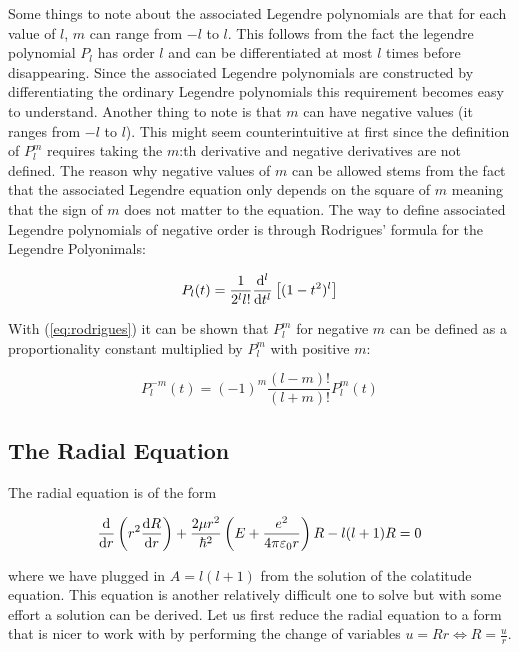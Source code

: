 \documentclass{article}
\begin{document}
    Some things to note about the associated Legendre polynomials are that for each value of $l$, $m$ can range from $-l$ to $l$. This follows from the fact the legendre polynomial $P_{l}$ has
    order $l$ and can be differentiated at most $l$ times before disappearing. Since the associated Legendre polynomials are constructed by differentiating the ordinary Legendre polynomials this
    requirement becomes easy to understand. Another thing to note is that $m$ can have negative values (it ranges from $-l$ to $l$). This might seem counterintuitive at first since the definition
    of $P^{m}_{l}$ requires taking the $m$:th derivative and negative derivatives are not defined. The reason why negative values of $m$ can be allowed stems from the fact that the associated Legendre
    equation only depends on the square of $m$ meaning that the sign of $m$ does not matter to the equation. The way to define associated Legendre polynomials of negative order is through Rodrigues'
    formula for the Legendre Polyonimals:

    \begin{equation}
        \label{eq:rodrigues}
        P_{l}(t) = \frac{1}{2^{l}l!}\odv[order = l]{}{t}\left[ (1 - t^2)^{l} \right]
    \end{equation}

    With (\ref{eq:rodrigues}) it can be shown that $P^{m}_{l}$ for negative $m$ can be defined as a proportionality constant multiplied by $P^{m}_{l}$ with positive $m$:

    \begin{equation}
        P^{-m}_{l}(t) = (-1)^{m}\frac{(l - m)!}{(l + m)!}P^{m}_{l}(t)
    \end{equation}
    
    \subsection{The Radial Equation}
        
    The radial equation is of the form

    \begin{equation}
        \label{eq:radial}
        \odv{}{r}\left( r^2\odv{R}{r} \right) + \frac{2\mu r^2}{\hbar^2}\left( E + \frac{e^2}{4\pi\varepsilon_{0}r} \right)R - l(l + 1)R = 0
    \end{equation}

    where we have plugged in $A = l(l + 1)$ from the solution of the colatitude equation. This equation is another relatively difficult one to solve but with some effort
    a solution can be derived. Let us first reduce the radial equation to a form that is nicer to work with by performing the change of variables $u = Rr \iff R = \frac{u}{r}$.
\end{document}
